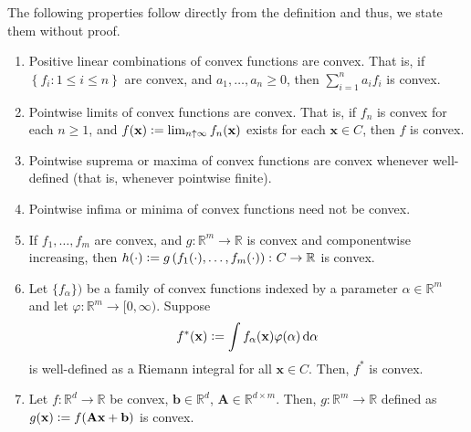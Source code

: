 The following properties follow directly from the definition and thus, we state them without proof. 

\begin{enumerate}
    \item Positive linear combinations of convex functions are convex. That is, if $\left\{ f_i \colon 1 \leq i \leq n \right\}$ are convex, and $a_1, \ldots, a_n \geq 0$, then $\sum_{i=1}^n a_i f_i$ is convex.

    \item Pointwise limits of convex functions are convex. That is, if $f_n$ is convex for each $n \geq 1$, and $f(\mathbf{x}) \vcentcolon= \lim_{n \uparrow \infty} f_n(\mathbf{x})$ exists for each $\mathbf{x} \in C$, then $f$ is convex. 

    \item Pointwise suprema or maxima of convex functions are convex whenever well-defined (that is, whenever pointwise finite).

    \item Pointwise infima or minima of convex functions need not be convex.

    \item If $f_1, \ldots, f_m$ are convex, and $g \colon \mathbb{R}^m \to \mathbb{R}$ is convex and componentwise increasing, then $h(\cdot) \vcentcolon= g\left( f_1(\cdot), \ldots, f_m(\cdot) \right) \colon C \to \mathbb{R}$ is convex. 

    \item Let $\{ f_\alpha \})$ be a family of convex functions indexed by a parameter $\alpha \in \mathbb{R}^m$ and let $\varphi \colon \mathbb{R}^m \to [0,\infty)$. Suppose
    \[
        f^*(\mathbf{x}) \vcentcolon= \int f_{\alpha}(\mathbf{x}) \varphi(\alpha) \, \mathrm{d}\alpha
    \]
    is well-defined as a Riemann integral for all $\mathbf{x} \in C$. Then, $f^*$ is convex.

    \item Let $f \colon \mathbb{R}^d \to \mathbb{R}$ be convex, $\mathbf{b} \in \mathbb{R}^d$, $\mathbf{A} \in \mathbb{R}^{d \times m}$. Then, $g \colon \mathbb{R}^m \to \mathbb{R}$ defined as $g(\mathbf{x}) \vcentcolon= f(\mathbf{Ax} + \mathbf{b})$ is convex. 
\end{enumerate}
